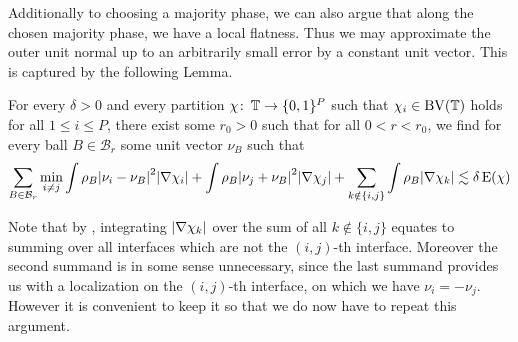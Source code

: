 Additionally to choosing a majority phase, we can also argue that along the 
chosen majority phase, we have a local flatness. Thus we may approximate the 
outer unit normal up to an arbitrarily small error by a constant unit vector. 
This is captured by the following Lemma.

\begin{lemma}
	\label{localization_lemma_with_normals}
	For every $ \delta > 0 $ and every partition $ \chi \colon \operatorname{\mathbb{T}} \to 
	\{ 0 , 1 \}^{ P } $ such that $ \chi_{ i } \in \operatorname{BV} ( \operatorname{\mathbb{T}} ) $ holds 
	for all $ 1 \leq i \leq P $, there exist some $ r_{ 0 } > 0 $ such that for 
	all $ 0 < r < r_{ 0 } $, we find for every ball $ B \in \mathcal{B}_{ r } $ 
	some unit vector $ \nu_{ B } $ such that
	\begin{equation*}
		\sum_{ B \in \mathcal{B}_{ r } }
		\min_{ i \neq j }
		\int
		\rho_{ B }
		\abs{ \nu_{ i } - \nu_{ B } }^{ 2 }
		\abs{ \nabla \chi_{ i } }
		+
		\int
		\rho_{ B }
		\abs{ \nu_{ j } + \nu_{ B } }^{ 2 }
		\abs{ \nabla \chi_{ j } }
		+
		\sum_{ k \notin \{ i , j \} }
		\int 
		\rho_{ B }
		\abs{ \nabla \chi_{ k } }
		\lesssim
		\delta \operatorname{E} ( \chi )
	\end{equation*}
\end{lemma}

Note that by , integrating  $ 
\abs{ \nabla \chi_{ k } } $ over the sum of all $ k \notin \{ i , j \} $ 
equates to summing over all interfaces which are not the $ (i,j)$-th interface. 
Moreover the second summand is in some sense unnecessary, since the last 
summand provides us with a localization on the $ (i,j)$-th interface, on which 
we have $ \nu_{ i } = - \nu_{ j } $.
However it is convenient to keep it so that we do now have to repeat this 
argument.

